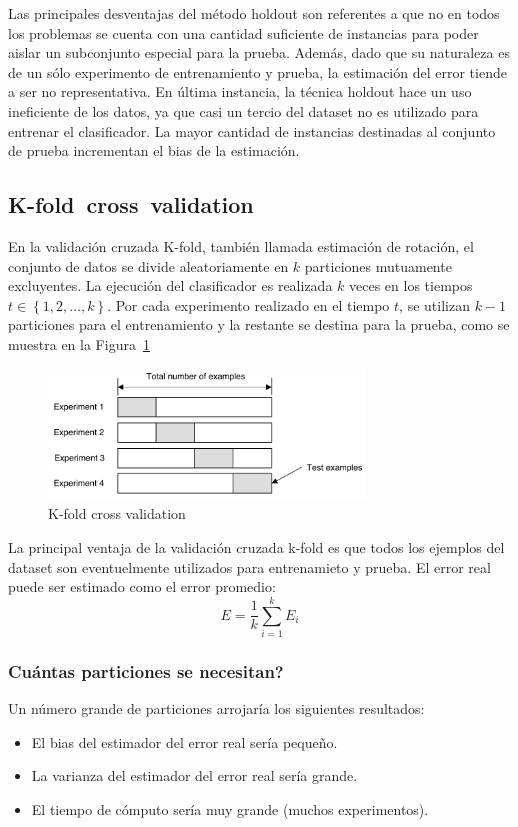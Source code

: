 \documentclass{article}
\begin{document}
Las principales desventajas del método holdout son referentes a que no en todos los problemas se cuenta con una cantidad suficiente de instancias para poder aislar un subconjunto especial para la prueba.
Además, dado que su naturaleza es de un sólo experimento de entrenamiento y prueba, la estimación del error tiende a ser no representativa.
En última instancia, la técnica holdout hace un uso ineficiente de los datos, ya que casi un tercio del dataset no es utilizado para entrenar el clasificador.
La mayor cantidad de instancias destinadas al conjunto de prueba incrementan el bias de la estimación.


\subsection{K-­fold cross validation}
En la validación cruzada K-fold, también llamada estimación de rotación, el conjunto de datos se divide aleatoriamente en $k$ particiones mutuamente excluyentes.
La ejecución del clasificador es realizada $k$ veces en los tiempos $t \in \left \{ 1,2,\ldots,k \right \} $.
Por cada experimento realizado en el tiempo $t$, se utilizan $k-1$ particiones para el entrenamiento y la restante se destina para la prueba, como se muestra en la Figura~\ref{fig:k-fold}
\begin{figure}
	\centering
	\includegraphics[width=0.75\textwidth]{resources/images/k-fold}
	\caption{K-fold cross validation}
	\label{fig:k-fold}
\end{figure}

La principal ventaja de la validación cruzada k-fold es que todos los ejemplos del dataset son eventuelmente utilizados para entrenamieto y prueba.
El error real puede ser estimado como el error promedio:
$$
	E = \frac{1}{k} \sum_{i=1}^k E_{i}
$$

\subsubsection*{Cuántas particiones se necesitan?}
Un número grande de particiones arrojaría los siguientes resultados:
\begin{itemize}
	\item \checkmark El bias del estimador del error real sería pequeño.
	\item \texttimes La varianza del estimador del error real sería grande.
	\item \texttimes El tiempo de cómputo sería muy grande (muchos experimentos).
\end{itemize}
\end{document}
